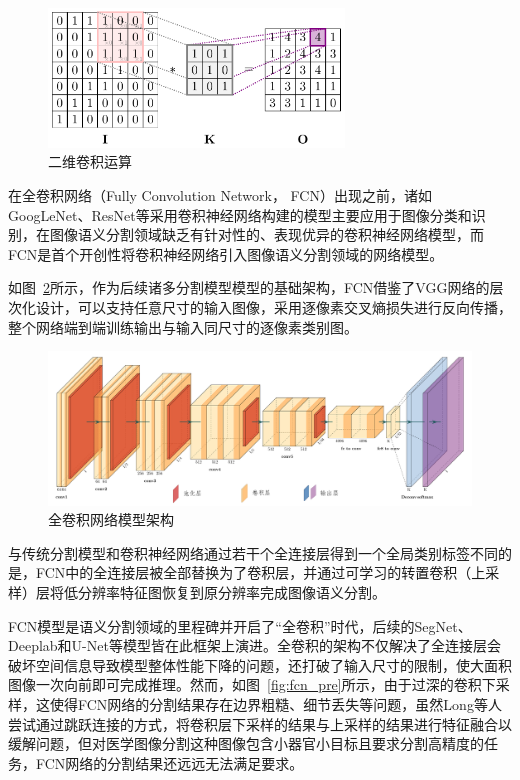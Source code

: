\begin{figure}[htbp]
    \centering
    \includegraphics[width=0.7\textwidth]{fig/2dcnn-1.png}
    \caption{二维卷积运算}
    \label{fig:2dcnn}
\end{figure}

在全卷积网络（Fully Convolution Network， FCN）出现之前，诸如GoogLeNet、ResNet等采用卷积神经网络构建的模型主要应用于图像分类和识别，在图像语义分割领域缺乏有针对性的、表现优异的卷积神经网络模型，而FCN是首个开创性将卷积神经网络引入图像语义分割领域的网络模型\cite{shelhamer2016}。

如图~\ref{fig:fcn_frame}所示，作为后续诸多分割模型模型的基础架构，FCN借鉴了VGG网络的层次化设计，可以支持任意尺寸的输入图像，采用逐像素交叉熵损失进行反向传播，整个网络端到端训练输出与输入同尺寸的逐像素类别图。

\begin{figure}[htbp]
    \centering
    \includegraphics[width=\textwidth]{fig/fcn_frame.png}
    \caption{全卷积网络模型架构}
    \label{fig:fcn_frame}
\end{figure}

与传统分割模型和卷积神经网络通过若干个全连接层得到一个全局类别标签不同的是，FCN中的全连接层被全部替换为了卷积层，并通过可学习的转置卷积（上采样）层将低分辨率特征图恢复到原分辨率完成图像语义分割。

FCN模型是语义分割领域的里程碑并开启了“全卷积”时代，后续的SegNet、Deeplab和U-Net等模型皆在此框架上演进。全卷积的架构不仅解决了全连接层会破坏空间信息导致模型整体性能下降的问题，还打破了输入尺寸的限制，使大面积图像一次向前即可完成推理。然而，如图~\ref{fig:fcn_pre}所示，由于过深的卷积下采样，这使得FCN网络的分割结果存在边界粗糙、细节丢失等问题，虽然Long等人尝试通过跳跃连接的方式，将卷积层下采样的结果与上采样的结果进行特征融合以缓解问题，但对医学图像分割这种图像包含小器官小目标且要求分割高精度的任务，FCN网络的分割结果还远远无法满足要求。

